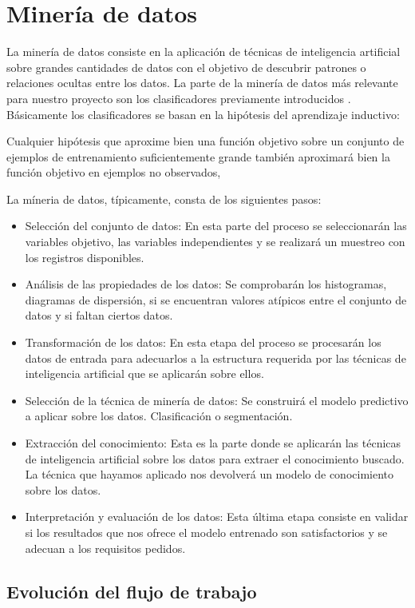 \section{Minería de datos}

La minería de datos consiste en la aplicación de técnicas de inteligencia artificial sobre grandes cantidades de datos con el objetivo de descubrir patrones o relaciones ocultas entre los datos. La parte de la minería de datos más relevante para nuestro proyecto son los clasificadores previamente introducidos \cite{procesosMineriaDatos}. Básicamente los clasificadores se basan en la hipótesis del aprendizaje inductivo:

Cualquier hipótesis que aproxime bien una función objetivo sobre un conjunto de ejemplos de entrenamiento suficientemente grande también aproximará bien la función objetivo en ejemplos no observados,

La míneria de datos, típicamente, consta de los siguientes pasos:
\begin{itemize}
	\item{Selección del conjunto de datos}: En esta parte del proceso se seleccionarán las variables objetivo, las variables independientes y se realizará un muestreo con los registros disponibles.
	\item{Análisis de las propiedades de los datos}: Se comprobarán los histogramas, diagramas de dispersión, si se encuentran valores atípicos entre el conjunto de datos y si faltan ciertos datos.
	\item{Transformación de los datos}: En esta etapa del proceso se procesarán los datos de entrada para adecuarlos a la estructura requerida por las técnicas de inteligencia artificial que se aplicarán sobre ellos.
	\item{Selección de la técnica de minería de datos}: Se construirá el modelo predictivo a aplicar sobre los datos. Clasificación o segmentación.
	\item{Extracción del conocimiento}: Esta es la parte donde se aplicarán las técnicas de inteligencia artificial sobre los datos para extraer el conocimiento buscado. La técnica que hayamos aplicado nos devolverá un modelo de conocimiento sobre los datos.
	\item{Interpretación y evaluación de los datos}: Esta última etapa consiste en validar si los resultados que nos ofrece el modelo entrenado son satisfactorios y se adecuan a los requisitos pedidos.
\end{itemize}

\subsection{Evolución del flujo de trabajo}

